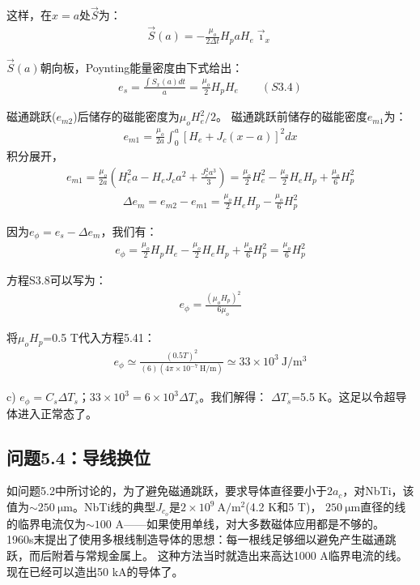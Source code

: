 这样，在$x=a$处$\vec{S}$为：
\begin{align*}%
\vec{S}(a)=-\frac{\mu_{o}}{2\Delta t}H_{p}aH_{e}\vec{\imath}_{x}\tag{S3.3}
\end{align*}

$\vec{S}(a)$朝向板，Poynting能量密度由下式给出：
\begin{align*}%
e_{s}=\frac{\int S_{x}(a)dt}{a}=\frac{\mu_{o}}{2}H_{p}H_{e}\qquad(S3.4)
\end{align*}

磁通跳跃($e_{m2}$)后储存的磁能密度为$\mu_o H_e^2/2$。
磁通跳跃前储存的磁能密度$e_{m1}$为： 
\begin{align*}%
e_{m1}=\frac{\mu_{o}}{2a}\int_{0}^{a}[H_{e}+J_{c}(x-a)]^{2}dx\tag{S3.5}
\end{align*}
积分展开，
\begin{align*}%
e_{m1}=\frac{\mu_{o}}{2a}(H_{e}^{2}a-H_{e}J_{c}a^{2}+\frac{J_{c}^{2}a^{3}}{3})=\frac{\mu_{o}}{2}H_{e}^{2}-\frac{\mu_{o}}{2}H_{e}H_{p}+\frac{\mu_{o}}{6}H_{p}^{2}\tag{S3.6}
\end{align*}
\begin{align*}%
\Delta e_{m}=e_{m2}-e_{m1}=\frac{\mu_{o}}{2}H_{e}H_{p}-\frac{\mu_{o}}{6}H_{p}^{2}\tag{S3.7}
\end{align*}

因为$e_\phi=e_s-\Delta e_m$，我们有：
\begin{align*}%
e_{\phi}=\frac{\mu_{o}}{2}H_{p}H_{e}-\frac{\mu_{o}}{2}H_{e}H_{p}+\frac{\mu_{o}}{6}H_{p}^{2}=\frac{\mu_{o}}{6}H_{p}^{2}\tag{S3.8}
\end{align*}

方程S3.8可以写为：
\begin{align*}%
e_{\phi}=\frac{(\mu_{o}H_{p})^{2}}{6\mu_{o}}\tag{5.41}
\end{align*}

将$\mu_o H_p$=0.5 T代入方程5.41：
\begin{align*}%
e_{\phi}\simeq\frac{(0.5T)^{2}}{(6)(4\pi\times10^{-7}\ \mathrm{H/m})}\simeq33\times10^{3}\ \mathrm{J/m^{3}}
\end{align*}

c) $e_\phi = C_s \Delta T_s；33\times 10^3= 6\times 10^3 \Delta T_s$。我们解得：
$\Delta T_s$=5.5 K。这足以令超导体进入正常态了。


\subsection{问题5.4：导线换位}
如问题5.2中所讨论的，为了避免磁通跳跃，要求导体直径要小于$2a_c$，对NbTi，该值为$\sim 250\ \mathrm{\mu m}$。NbTi线的典型$J_{c_o}$是$2\times 10^9\ \mathrm{A/m^2}$(4.2 K和5 T)，
$250\ \mathrm{\mu m}$直径的线的临界电流仅为$\sim 100$ A——如果使用单线，对大多数磁体应用都是不够的。
1960s末提出了使用多根线制造导体的思想：每一根线足够细以避免产生磁通跳跃，而后附着与常规金属上。
这种方法当时就造出来高达1000 A临界电流的线。现在已经可以造出50 kA的导体了。

